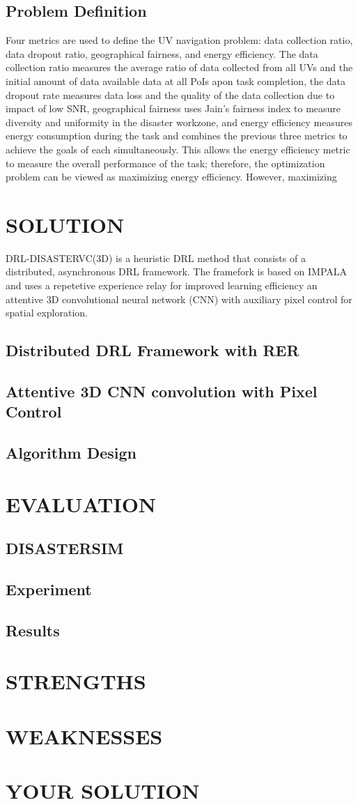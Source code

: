 \documentclass[sigconf, natbib=false]{acmart}
\begin{document}
   \subsection{Problem Definition}
   Four metrics are used to define the UV navigation problem: data collection ratio, data dropout ratio, geographical fairness, and energy efficiency. The data collection ratio measures the average ratio of data collected from all UVs and the initial amount of data available data at all PoIs apon task completion, the data dropout rate measures data loss and the quality of the data collection due to impact of low SNR, geographical fairness uses Jain's fairness index to measure diversity and uniformity in the disaster workzone, and energy efficiency measures energy consumption during the task and combines the previous three metrics to achieve the goals of each simultaneously. This allows the energy efficiency metric to measure the overall performance of the task; therefore, the optimization problem can be viewed as maximizing energy efficiency. However, maximizing 

   \section{SOLUTION}
   DRL-DISASTERVC(3D) is a heuristic DRL method that consists of a distributed, asynchronous DRL framework. The framefork is based on IMPALA and uses a repetetive experience relay for improved learning efficiency an attentive 3D convolutional neural network (CNN) with auxiliary pixel control for spatial exploration.
   \subsection{Distributed DRL Framework with RER}
   \subsection{Attentive 3D CNN convolution with Pixel Control}
   \subsection{Algorithm Design}

   \section{EVALUATION}
   \subsection{DISASTERSIM}
   \subsection{Experiment}
   \subsection{Results}

   \section{STRENGTHS}

   \section{WEAKNESSES}

   \section{YOUR SOLUTION}
\end{document}
